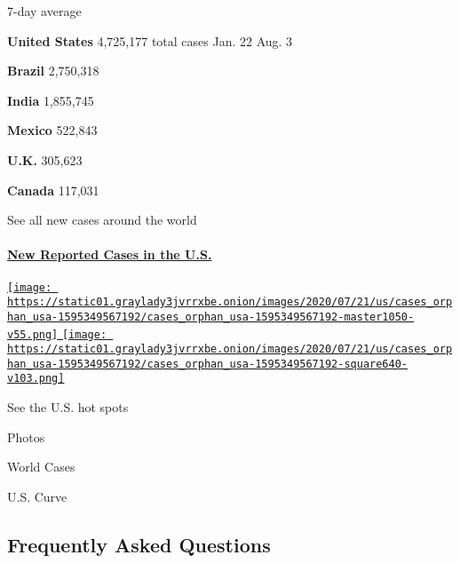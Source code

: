 \href{https://www.nytimes3xbfgragh.onion/interactive/2020/us/coronavirus-us-cases.html}{}

7-day average

\textbf{United States} 4,725,177 total cases Jan. 22 Aug.
3\href{https://www.nytimes3xbfgragh.onion/interactive/2020/world/americas/brazil-coronavirus-cases.html}{}

\textbf{Brazil} 2,750,318
\href{https://www.nytimes3xbfgragh.onion/interactive/2020/world/asia/india-coronavirus-cases.html}{}

\textbf{India} 1,855,745
\href{https://www.nytimes3xbfgragh.onion/interactive/2020/world/americas/mexico-coronavirus-cases.html}{}

\textbf{Mexico} 522,843
\href{https://www.nytimes3xbfgragh.onion/interactive/2020/world/europe/united-kingdom-coronavirus-cases.html}{}

\textbf{U.K.} 305,623
\href{https://www.nytimes3xbfgragh.onion/interactive/2020/world/canada/canada-coronavirus-cases.html}{}

\textbf{Canada} 117,031

\href{https://www.nytimes3xbfgragh.onion/interactive/2020/world/coronavirus-maps.html}{}

See all new cases around the world

\hypertarget{new-reported-cases-in-the-us}{%
\paragraph{\texorpdfstring{\href{https://www.nytimes3xbfgragh.onion/interactive/2020/us/coronavirus-us-cases.html}{New
Reported Cases in the
U.S.}}{New Reported Cases in the U.S.}}\label{new-reported-cases-in-the-us}}

\href{https://www.nytimes3xbfgragh.onion/interactive/2020/us/coronavirus-us-cases.html}{\texttt{[image: https://static01.graylady3jvrrxbe.onion/images/2020/07/21/us/cases\_orphan\_usa-1595349567192/cases\_orphan\_usa-1595349567192-master1050-v55.png]}
\texttt{[image: https://static01.graylady3jvrrxbe.onion/images/2020/07/21/us/cases\_orphan\_usa-1595349567192/cases\_orphan\_usa-1595349567192-square640-v103.png]}}

See the U.S. hot spots

Photos

World Cases

U.S. Curve

\hypertarget{frequently-asked-questions}{%
\subsection{Frequently Asked
Questions}\label{frequently-asked-questions}}

